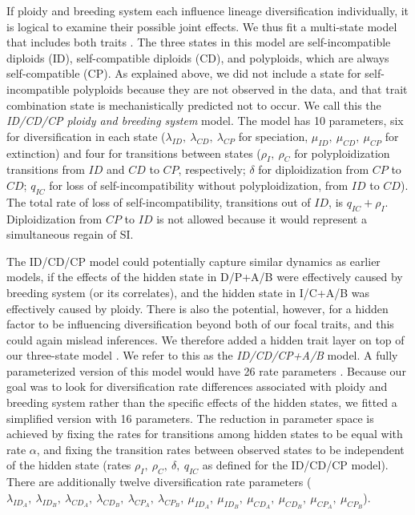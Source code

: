 If ploidy and breeding system each influence lineage diversification individually, it is logical to examine their possible joint effects. %
We thus fit a multi-state model that includes both traits \citep[MuSSE,][]{fitzjohn_2012}.
The three states in this model are self-incompatible diploids (ID), self-compatible diploids (CD), and polyploids, which are always self-compatible (CP).
As explained above, we did not include a state for self-incompatible polyploids because they are not observed in the data, and   that trait combination state is mechanistically predicted not to occur.
We call this the \textit{ID/CD/CP ploidy and breeding system} model.
The model has 10 parameters, six for diversification in each state ($\lambda_{ID},\ \lambda_{CD},\ \lambda_{CP}$ for speciation, $\mu_{ID},\ \mu_{CD},\ \mu_{CP}$ for extinction) and four for transitions between states ($\rho_I,\ \rho_C$ for polyploidization transitions from $ID$ and $CD$ to $CP$, respectively; $\delta$ for diploidization from $CP$ to $CD$; $q_{IC}$ for loss of self-incompatibility without polyploidization, from $ID$ to $CD$).
The total rate of loss of self-incompatibility, \ie transitions out of $ID$, is $q_{IC} + \rho_I$.
Diploidization from $CP$ to $ID$ is not allowed because it would represent a simultaneous regain of SI.

The ID/CD/CP model could potentially capture similar dynamics as earlier models, if the effects of the hidden state in D/P+A/B were effectively caused by breeding system (or its correlates), and the hidden state in I/C+A/B was effectively caused by ploidy.
There is also the potential, however, for a hidden factor to be influencing diversification beyond both of our focal traits, and this could again mislead inferences.
We therefore added a hidden trait layer on top of our three-state model \citep[analogous to][]{caetano_2018, herrera_2018, huang_2018}.
We refer to this as the \textit{ID/CD/CP+A/B} model.
A fully parameterized version of this model would have 26 rate parameters \citep{herrera_2018}. 
Because our goal was to look for diversification rate differences associated with ploidy and breeding system rather than the specific effects of the hidden states, we fitted a simplified version with 16 parameters.
The reduction in parameter space is achieved by fixing the rates for transitions among hidden states to be equal with rate $\alpha$, and fixing the transition rates between observed states to be independent of the hidden state (rates $\rho_I,\ \rho_C,\ \delta,\ q_{IC}$ as defined for the ID/CD/CP model).
There are additionally twelve diversification rate parameters ($\lambda_{ID_A},\ \lambda_{ID_B},\ \lambda_{CD_A},\ \lambda_{CD_B},\ \lambda_{CP_A},\ \lambda_{CP_B},\ \mu_{ID_A},\ \mu_{ID_B},\ \mu_{CD_A},\ \mu_{CD_B},\ \mu_{CP_A},\ \mu_{CP_B}$).

